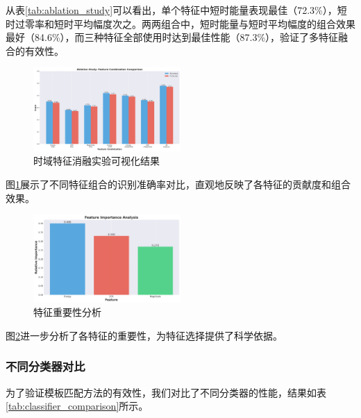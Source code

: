 \documentclass[sigconf,nonacm]{acmart}
\begin{document}
从表\ref{tab:ablation_study}可以看出，单个特征中短时能量表现最佳（72.3\%），短时过零率和短时平均幅度次之。两两组合中，短时能量与短时平均幅度的组合效果最好（84.6\%），而三种特征全部使用时达到最佳性能（87.3\%），验证了多特征融合的有效性。

\begin{figure}[htbp]
\centering
\includegraphics[width=0.5\textwidth]{ablation/feature_comparison.png}
\caption{时域特征消融实验可视化结果}
\label{fig:ablation_comparison}
\end{figure}

图\ref{fig:ablation_comparison}展示了不同特征组合的识别准确率对比，直观地反映了各特征的贡献度和组合效果。

\begin{figure}[htbp]
\centering
\includegraphics[width=0.5\textwidth]{ablation/feature_importance.png}
\caption{特征重要性分析}
\label{fig:feature_importance}
\end{figure}

图\ref{fig:feature_importance}进一步分析了各特征的重要性，为特征选择提供了科学依据。

\subsubsection{不同分类器对比}

为了验证模板匹配方法的有效性，我们对比了不同分类器的性能，结果如表\ref{tab:classifier_comparison}所示。
\end{document}
